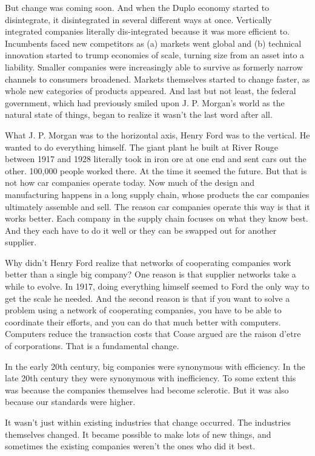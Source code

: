 But change was coming soon. And when the Duplo economy started to
disintegrate, it disintegrated in several different ways at once.
Vertically integrated companies literally dis-integrated because it was
more efficient to. Incumbents faced new competitors as (a) markets went
global and (b) technical innovation started to trump economies of scale,
turning size from an asset into a liability. Smaller companies were
increasingly able to survive as formerly narrow channels to consumers
broadened. Markets themselves started to change faster, as whole new
categories of products appeared. And last but not least, the federal
government, which had previously smiled upon J. P. Morgan's world as the
natural state of things, began to realize it wasn't the last word after
all.

What J. P. Morgan was to the horizontal axis, Henry Ford was to the
vertical. He wanted to do everything himself. The giant plant he built
at River Rouge between 1917 and 1928 literally took in iron ore at one
end and sent cars out the other. 100,000 people worked there. At the
time it seemed the future. But that is not how car companies operate
today. Now much of the design and manufacturing happens in a long supply
chain, whose products the car companies ultimately assemble and sell.
The reason car companies operate this way is that it works better. Each
company in the supply chain focuses on what they know best. And they
each have to do it well or they can be swapped out for another supplier.

Why didn't Henry Ford realize that networks of cooperating companies
work better than a single big company? One reason is that supplier
networks take a while to evolve. In 1917, doing everything himself
seemed to Ford the only way to get the scale he needed. And the second
reason is that if you want to solve a problem using a network of
cooperating companies, you have to be able to coordinate their efforts,
and you can do that much better with computers. Computers reduce the
transaction costs that Coase argued are the raison d'etre of
corporations. That is a fundamental change.

In the early 20th century, big companies were synonymous with
efficiency. In the late 20th century they were synonymous with
inefficiency. To some extent this was because the companies themselves
had become sclerotic. But it was also because our standards were higher.

It wasn't just within existing industries that change occurred. The
industries themselves changed. It became possible to make lots of new
things, and sometimes the existing companies weren't the ones who did it
best.

